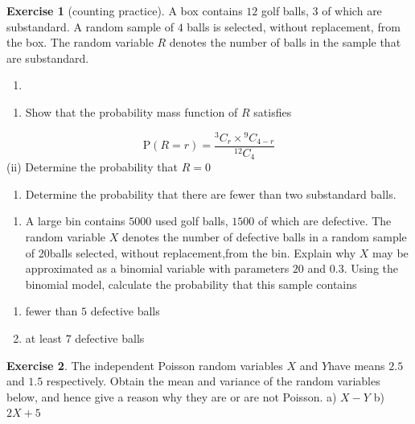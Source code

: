 \documentclass[
]{book}
\providecommand{\tightlist}{%
  \setlength{\itemsep}{0pt}\setlength{\parskip}{0pt}}
\theoremstyle{definition}
\theoremstyle{definition}
\theoremstyle{definition}
\newtheorem{exercise}{Exercise}[chapter]
\theoremstyle{definition}
\theoremstyle{remark}
\begin{document}
\begin{exercise}[counting practice]

A box contains \(12\) golf balls, \(3\) of which are substandard. A random sample of \(4\) balls is selected, without replacement, from the box. The random variable \(R\) denotes the number of balls in the sample that are substandard.

\begin{enumerate}
\def\labelenumi{\alph{enumi})}
\item
\end{enumerate}

\begin{enumerate}
\def\labelenumi{(\roman{enumi})}
\tightlist
\item
  Show that the probability mass function of \(R\) satisfies
\end{enumerate}

\[\text{P}(R=r) = \frac{{}^3C_r \times {}^9C_{4-r}}{^{12}C_{4}} \]
(ii) Determine the probability that \(R=0\)

\begin{enumerate}
\def\labelenumi{(\roman{enumi})}
\setcounter{enumi}{2}
\tightlist
\item
  Determine the probability that there are fewer than two substandard balls.
\end{enumerate}

\begin{enumerate}
\def\labelenumi{\alph{enumi})}
\setcounter{enumi}{1}
\tightlist
\item
  A large bin contains \(5000\) used golf balls, \(1500\) of which are defective. The random variable \(X\) denotes the number of defective balls in a random sample of 20balls selected, without replacement,from the bin. Explain why \(X\) may be approximated as a binomial variable with parameters \(20\) and \(0.3\). Using the binomial model, calculate the probability that this sample contains
\end{enumerate}

\begin{enumerate}
\def\labelenumi{(\roman{enumi})}
\item
  fewer than \(5\) defective balls
\item
  at least \(7\) defective balls
\end{enumerate}

\end{exercise}

\begin{exercise}
The independent Poisson random variables \(X\) and \(Y\)have means \(2.5\) and \(1.5\) respectively. Obtain the mean and variance of the random variables below, and hence give a reason why they are or are not Poisson.
a) \(X-Y\)
b) \(2X+5\)
\end{exercise}
\end{document}
